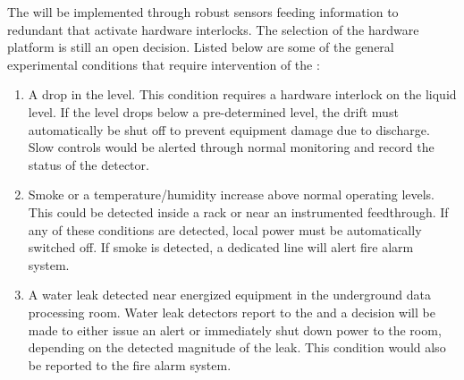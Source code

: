 The  will be implemented through robust sensors feeding
information to redundant  that activate hardware
interlocks. The selection of the  hardware platform is
still an open decision.  Listed below are some of the general
 experimental conditions that require intervention of the
:
\begin{enumerate}
 \item A drop in the  level.  This condition requires a hardware
   interlock on the liquid level.  If the level drops below a
   pre-determined level, the drift   must automatically be 
   shut off to prevent equipment damage due to  discharge.  Slow controls would be
   alerted through normal monitoring and record the status of the detector.
 \item Smoke or a temperature/humidity increase above normal operating
   levels. This could be detected inside a rack or near an instrumented
   feedthrough.  If any of these conditions are detected, local
   power must be automatically switched off. If smoke is detected, a
   dedicated line will alert  fire alarm system.
 \item A water leak detected near energized equipment in the 
   underground data processing room.  Water leak detectors 
   report to the   and a decision will be made to either
   issue an alert or immediately shut down power to the room, depending
   on the detected magnitude of the leak.  This condition would also be reported
   to the  fire alarm system.
\end{enumerate}




